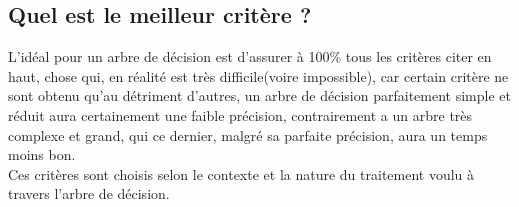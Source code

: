 \documentclass[a4paper, 11pt]{report}
\begin{document}
\subsection{Quel est le meilleur critère ?}
L'idéal pour un arbre de décision est d'assurer à 100\% tous les critères citer en haut, chose qui, en réalité est très difficile(voire impossible), car certain critère ne sont obtenu qu'au détriment d'autres, un arbre de décision parfaitement simple et réduit aura certainement une faible précision, contrairement a un arbre très complexe et grand, qui ce dernier, malgré sa parfaite précision, aura un temps  moins bon.\\
Ces critères sont choisis selon le contexte et la nature du traitement voulu à travers l'arbre de décision.
\end{document}
